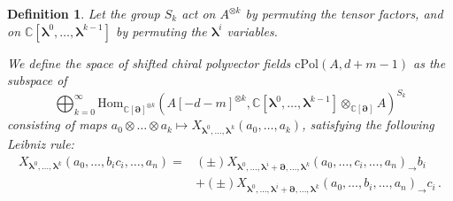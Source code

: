 \documentclass[11pt]{article}
\newcommand{\C}{\mathbb{C}}
\numberwithin{equation}{section}
\newtheorem{definition}{Definition}[section]
\begin{document}
\begin{definition}
	Let the group $S_{k}$ act on $A^{\otimes k}$ by permuting the tensor factors, and on $\C[\boldsymbol{\lambda}^{0}, \dots, \boldsymbol{\lambda}^{k-1}]$ by permuting the $\boldsymbol{\lambda}^i$ variables.

	We define the space of shifted chiral polyvector fields $\mathrm{cPol}(A,d+m-1)$ as the subspace of
	\begin{equation}
		\bigoplus_{k = 0}^{\infty} \mathrm{Hom}_{\C[\boldsymbol{\partial}]^{\otimes k}}(A[-d-m]^{\otimes k}, \C[\boldsymbol{\lambda}^{0}, \dots, \boldsymbol{\lambda}^{k-1}] \otimes_{\C[\boldsymbol{\partial}]} A)^{S_{k}}
	\end{equation}
	consisting of maps $a_0\otimes \dots \otimes a_k \mapsto X_{\boldsymbol{\lambda}^0,\dots, \boldsymbol{\lambda}^{k}}(a_0,\dots, a_k)$, satisfying the following Leibniz rule:
	\begin{equation}\label{eq:cPois_Leb}
		\begin{aligned}
			X_{\boldsymbol{\lambda}^0,\dots,\boldsymbol{\lambda}^{k}}(a_0,\dots,b_ic_i,\dots, a_n) = & (\pm)X_{\boldsymbol{\lambda}^0,\dots,\boldsymbol{\lambda}^i+\boldsymbol{\partial},\dots,\boldsymbol{\lambda}^{k}}(a_0,\dots, c_i,\dots, a_n)_{\rightarrow}b_i\\
			& + (\pm)X_{\boldsymbol{\lambda}^0,\dots,\boldsymbol{\lambda}^i+\boldsymbol{\partial},\dots,\boldsymbol{\lambda}^{k}}(a_0,\dots, b_i,\dots, a_n)_{\rightarrow}c_i\,.
		\end{aligned}
	\end{equation}
\end{definition}
\end{document}
